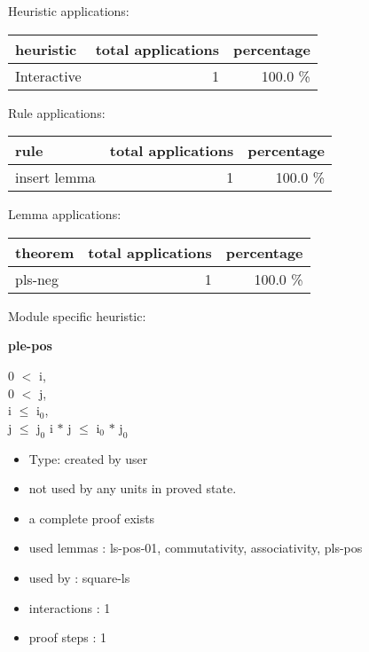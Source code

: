 \documentclass[a4paper]{article}
\begin{document}
\medskip


Heuristic applications:

\begin{supertabular}{l|r|r}
heuristic	& total applications & percentage \\ \hline
Interactive & 1 & 100.0 \% \\

\end{supertabular}

Rule applications:

\begin{supertabular}{l|r|r}
rule	        & total applications & percentage \\ \hline
insert lemma & 1 & 100.0 \% \\

\end{supertabular}

Lemma applications:

\begin{supertabular}{l|r|r}
theorem	        & total applications & percentage \\ \hline
pls-neg & 1 & 100.0 \% \\

\end{supertabular}

Module specific heuristic:

\pagebreak

{\LARGE\bf ple-pos}\label{lemma-ple-pos}

\medskip

0 $<$ i, \\
0 $<$ j, \\
i $\le$ $\mbox{i}_{0}$, \\
j $\le$ $\mbox{j}_{0}$ \Fol i $*$ j $\le$ $\mbox{i}_{0}$ $*$ $\mbox{j}_{0}$

\begin{itemize}

\item Type: created by user

\item not used by any units in proved state.
\item       a complete proof exists
\item       used lemmas  : ls-pos-01, commutativity, associativity, pls-pos
\item       used by      : square-ls
\item       interactions : 1
\item       proof steps  : 1
\end{itemize}
\end{document}
